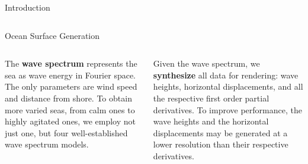 \documentclass[final,hyperref={pdfpagelabels=true}]{beamer}
\begin{document}
\begin{frame}
\begin{center}
\begin{minipage}{0.99\textwidth}
\begin{block}{Introduction}
\begin{columns}[t]
\begin{column}{0.45\linewidth}
				\end{column}	  
			\end{columns}
		\end{block}
	\end{minipage}
	\begin{minipage}{0.99\textwidth}
		\begin{block}{Ocean Surface Generation}	
			\begin{columns}[t]
				\begin{column}{0.45\linewidth}
					The \textbf{wave spectrum} represents the sea as wave energy in Fourier space.
					The only parameters are wind speed and distance from shore.
					To obtain more varied seas, from calm ones to highly agitated ones, we employ
					not just one, but four well-established wave spectrum models.
					\begin{figure}
					\centering
					\end{figure}
				\end{column}
				\begin{column}{0.45\linewidth}
					Given the wave spectrum, we \textbf{synthesize} all data for rendering:
					wave heights, horizontal displacements, and all the respective first order
					partial derivatives. To improve performance, the wave heights and the
					horizontal displacements may be generated at a lower resolution than
					their respective derivatives.

\end{column}
\end{columns}
\end{block}
\end{minipage}
\end{center}
\end{frame}
\end{document}
